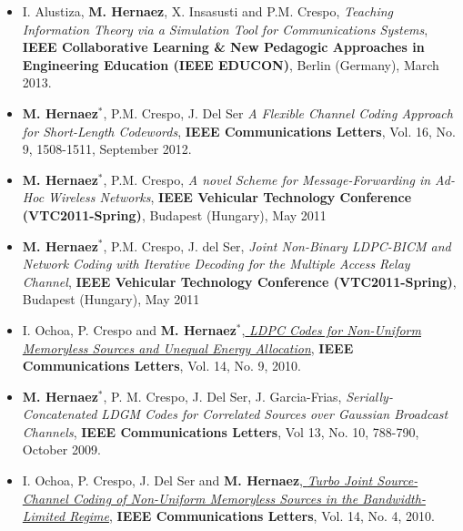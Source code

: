 \documentclass[11pt,a4paper,sans]{moderncv}        %
\begin{document}
\begin{itemize}
\item I. Alustiza, \textbf{M. Hernaez}, X. Insasusti and P.M. Crespo, {\emph{ Teaching Information Theory via a Simulation Tool for Communications Systems}}, \textbf{IEEE Collaborative Learning \& New Pedagogic Approaches in Engineering Education (IEEE EDUCON)}, Berlin (Germany), March  2013.\\

\item \textbf{M. Hernaez}$^\ast$, P.M. Crespo, J. {Del Ser} \emph{A Flexible Channel Coding Approach for Short-Length Codewords}, \textbf{IEEE Communications Letters}, Vol. 16, No. 9, 1508-1511, September 2012.\\

\item \textbf{M. Hernaez}$^\ast$, P.M. Crespo, \emph{A novel Scheme for Message-Forwarding in Ad-Hoc Wireless Networks}, \textbf{IEEE Vehicular Technology Conference (VTC2011-Spring)}, Budapest (Hungary), May 2011 \\

\item \textbf{M. Hernaez}$^\ast$, P.M. Crespo, J. del Ser, \emph{ Joint Non-Binary LDPC-BICM and Network Coding with Iterative Decoding for the Multiple Access Relay Channel}, \textbf{IEEE Vehicular Technology Conference (VTC2011-Spring)}, Budapest (Hungary),  May 2011 \\

\item I. Ochoa, P. Crespo and \textbf{M. Hernaez}$^\ast$,\href{http://web.stanford.edu/~iochoa/publishedPublications/2010_ldpc_paper.pdf} {\emph{ LDPC Codes for Non-Uniform Memoryless Sources and Unequal Energy Allocation}}, \textbf{IEEE Communications Letters}, Vol. 14, No. 9, 2010.\\

\item \textbf{M. Hernaez}$^\ast$, P. M. Crespo, J. {Del Ser}, J. Garcia-Frias, {\emph{ Serially-Concatenated LDGM Codes for Correlated Sources over Gaussian Broadcast Channels}}, \textbf{IEEE Communications Letters}, Vol 13, No. 10, 788-790, October 2009.\\

\item I. Ochoa, P. Crespo, J. Del Ser and \textbf{M. Hernaez},\href{http://web.stanford.edu/~iochoa/publishedPublications/2010_turbo_paper.pdf} {\emph{ Turbo Joint Source-Channel Coding of Non-Uniform Memoryless Sources in the Bandwidth-Limited Regime}}, \textbf{IEEE Communications Letters}, Vol. 14, No. 4, 2010.\\

\end{itemize}
\end{document}

